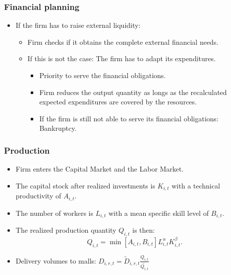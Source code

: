 \documentclass{beamer}
\begin{document}
{

  \frametitle{Financial planning} 
\begin{itemize}

\item If the firm has to raise external liquidity:
\begin{itemize}
	\item Firm checks if it obtains the complete external financial needs.
	\item If this is not the case: The firm has to adapt its expenditures.
	
\begin{itemize}
	\item Priority to serve the financial obligations.
	\item Firm reduces the output quantity as longs as the recalculated expected expenditures are covered by the resources.
	\item If the firm is still not able to serve its financial obligations: Bankruptcy.   
\end{itemize}
\end{itemize}
 
\end{itemize}
  
}




\frame
{

  \frametitle{Production} 
\begin{itemize}

\item Firm enters the Capital Market and the Labor Market.

\item The capital stock after realized investments is $K_{i,t}$ with a technical productivity of $A_{i,t}.$

\item The number of workers is $L_{i,t}$ with a mean specific skill level of $B_{i,t}.$

\item The realized production quantity $Q_{i,t}$ is then:
\[
Q_{i,t}=  \min \left[A_{i,t},B_{i,t}\right] L_{i,t}^{\alpha}K_{i,t}^{\beta}.
\]

\item Delivery volumes to malls: $D_{i,r,t}= \tilde{D}_{i,r,t}\frac{Q_{i,t}}{\tilde{Q_{i,t}}}$

\end{itemize}
  
}
\end{document}
